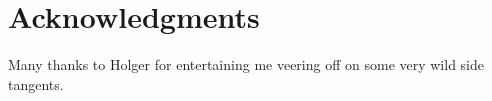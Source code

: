 \section*{Acknowledgments}
Many thanks to Holger for entertaining me veering off on some very wild side tangents.
